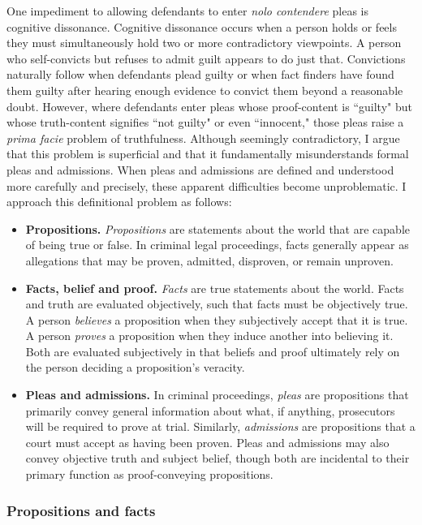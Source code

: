 One impediment to allowing defendants to enter \textit{nolo contendere} pleas is cognitive dissonance. Cognitive dissonance occurs when a person holds or feels they must simultaneously hold two or more contradictory viewpoints. A person who self-convicts but refuses to admit guilt appears to do just that. Convictions naturally follow when defendants plead guilty or when fact finders have found them guilty after hearing enough evidence to convict them beyond a reasonable doubt. However, where defendants enter pleas whose proof-content is ``guilty" but whose truth-content signifies ``not guilty" or even ``innocent," those pleas raise a \textit{prima facie} problem of truthfulness. Although seemingly contradictory, I argue that this problem is superficial and that it fundamentally misunderstands formal pleas and admissions. When pleas and admissions are defined and understood more carefully and precisely, these apparent difficulties become unproblematic. I approach this definitional problem as follows:

\begin{itemize}
    \item \textbf{Propositions.} \textit{Propositions} are statements about the world that are capable of being true or false. In criminal legal proceedings, facts generally appear as allegations that may be proven, admitted, disproven, or remain unproven.
    \item \textbf{Facts, belief and proof.} \textit{Facts} are true statements about the world. Facts and truth are evaluated objectively, such that facts must be objectively true. A person \textit{believes} a proposition when they subjectively accept that it is true. A person \textit{proves} a proposition when they induce another into believing it. Both are evaluated subjectively in that beliefs and proof ultimately rely on the person deciding a proposition's veracity.
    \item \textbf{Pleas and admissions.} In criminal proceedings, \textit{pleas} are propositions that primarily convey general information about what, if anything, prosecutors will be required to prove at trial. Similarly, \textit{admissions} are propositions that a court must accept as having been proven. Pleas and admissions may also convey objective truth and subject belief, though both are incidental to their primary function as proof-conveying propositions.
\end{itemize}

\subsubsection{Propositions and facts}

